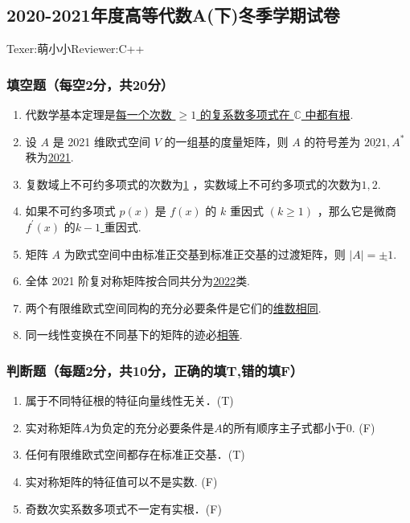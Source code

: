 \subsection{2020-2021年度高等代数A(下)冬季学期试卷}

\begin{center}
    Texer:萌小小\quad Reviewer:C++ \\
\end{center}

\subsubsection*{填空题（每空2分，共20分）}

\begin{enumerate}
    \item 代数学基本定理是\underline{每一个次数 $\geq 1$ 的复系数多项式在 $\mathbb{C}$ 中都有根}.
    \item 设 $A$ 是 2021 维欧式空间 $V$ 的一组基的度量矩阵，则 $A$ 的符号差为 $\underline{2021}, A^*$ 秩为\underline{2021}.
    \item 复数域上不可约多项式的次数为\underline{1} ，实数域上不可约多项式的次数为\underline{$1,2$}.
    \item 如果不可约多项式 $p(x)$ 是 $f(x)$ 的 $k$ 重因式 $(k \geq 1)$ ，那么它是微商 $f^\prime(x)$ 的\underline{$k-1$ }重因式.
    \item 矩阵 $A$ 为欧式空间中由标准正交基到标准正交基的过渡矩阵，则 $|A|=\underline{\pm 1}$.
    \item 全体 2021 阶复对称矩阵按合同共分为\underline{2022}类.
    \item 两个有限维欧式空间同构的充分必要条件是它们的\underline{维数相同}.
    \item 同一线性变换在不同基下的矩阵的迹必\underline{相等}.
\end{enumerate}

\subsubsection*{判断题（每题2分，共10分，正确的填T,错的填F）}

\begin{enumerate}
    \item 属于不同特征根的特征向量线性无关．\hfill (T)
    \item 实对称矩阵$A$为负定的充分必要条件是$A$的所有顺序主子式都小于0. \hfill (F)
    \item 任何有限维欧式空间都存在标准正交基．\hfill (T)
    \item 实对称矩阵的特征值可以不是实数. \hfill (F)
    \item 奇数次实系数多项式不一定有实根．\hfill (F)
\end{enumerate}

